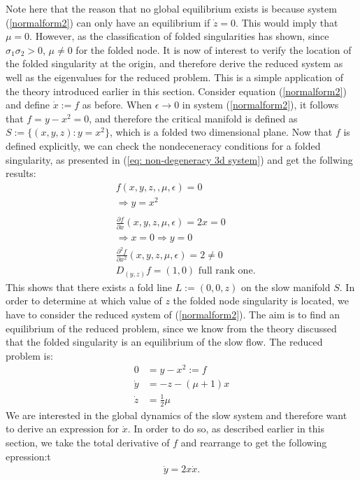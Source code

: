 Note here that the reason that no global equilibrium exists is because system (\ref{normalform2}) can only have an equilibrium if $\dot{z} =0$. This would imply that $\mu=0$. However, as the classification of folded singularities has shown, since $\sigma_1 \sigma_2 >0$,  $\mu \neq 0$ for the folded node.
It is now of interest to verify the location of the folded singularity at the origin, and therefore derive the reduced system as well as the eigenvalues for the reduced problem.
This is a simple application of the theory introduced earlier in this section.
Consider equation (\ref{normalform2}) and define $\dot{x}:=f$ as before. When $\epsilon \to 0$ in system (\ref{normalform2}), it follows that $f= y-x^2 =0$, and therefore the critical manifold is defined as $S:= \{ (x,y,z) : y=x^2\}$, which is a folded two dimensional plane.
Now that $f$ is defined explicitly, we can check the nondeceneracy conditions for a folded singularity, as presented in (\ref{eq: non-degeneracy 3d system}) and get the follwing results:
\begin{align*}
&f(x,y,z,,\mu, \epsilon) = 0\\
&\Rightarrow y=x^2\\
\\
&\frac{\partial f}{\partial x} (x,y,z,\mu,\epsilon) = 2x = 0\\
&\Rightarrow x=0 \Rightarrow y=0 \\
&\frac{\partial^2 f}{\partial x^2}(x,y,z,\mu,\epsilon)  = 2 \neq 0\\
&D_{(y,z)}f= (1,0) \textrm{ full rank one}.
\end{align*}
This shows that there exists a fold line $L:=(0,0,z)$ on the slow manifold $S$.
In order to determine at which value of $z$ the folded node singularity is located, we have to consider the reduced system of (\ref{normalform2}). The aim is to find an equilibrium of the reduced problem, since we know from the theory discussed that the folded singularity is an equilibrium of the slow flow.
The reduced problem is:
\begin{align}\label{normalform2red}
0 &= y - x^2 :=f\\
\dot{y} &=- z -(\mu +1)x \\
\dot{z} &=\frac{1}{2} \mu
\end{align}
We are interested in the global dynamics of the slow system and therefore want to derive an expression for $\dot{x}$. In order to do so, as described earlier in this section, we take the total derivative of $f$ and rearrange to get the following epression:t
\begin{align} \label{yxderivrel}
\dot{y} = 2x \dot{x}.
\end{align}
